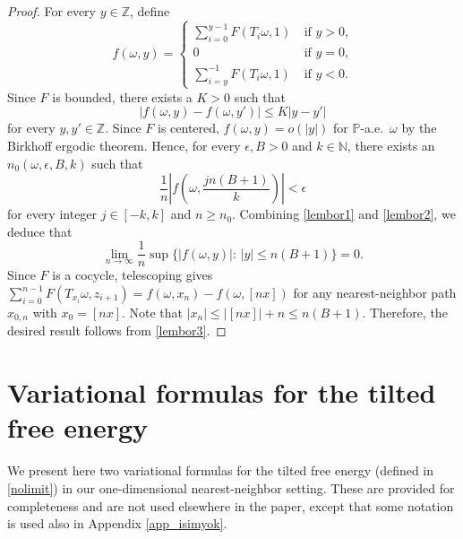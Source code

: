 \documentclass[a4paper]{amsart}
\numberwithin{equation}{section}
\theoremstyle{plain}
\theoremstyle{remark}
\begin{document}
\begin{proof}
For every $y\in\mathbb{Z}$, define
$$f(\omega,y) = \begin{cases}\sum_{i=0}^{y-1}F(T_i\omega,1)&\ \text{if $y>0$,}\\0&\ \text{if $y=0$,}\\\sum_{i=y}^{-1}F(T_i\omega,1)&\ \text{if $y<0$.}\end{cases}$$
Since $F$ is bounded, there exists a $K>0$ such that
\begin{equation}\label{lembor1}
|f(\omega,y) - f(\omega,y')| \le K|y-y'|
\end{equation}
for every $y,y'\in\mathbb{Z}$. Since $F$ is centered, $f(\omega,y) = o(|y|)$ for $\mathbb{P}$-a.e.\ $\omega$ by the Birkhoff ergodic theorem. Hence, for every ${\epsilon},B>0$ and $k\in\mathbb{N}$, there exists an $n_0(\omega,{\epsilon},B,k)$ such that
\begin{equation}\label{lembor2}
\frac1{n}\left|f\left(\omega,\frac{jn(B+1)}{k}\right)\right| < {\epsilon}
\end{equation}
for every integer $j\in[-k,k]$ and $n\ge n_0$. Combining \eqref{lembor1} and \eqref{lembor2}, we deduce that
\begin{equation}\label{lembor3}
\lim_{n\to\infty}\frac1{n}\sup\{|f(\omega,y)|:\,|y|\le n(B+1)\} = 0.
\end{equation}
Since $F$ is a cocycle, telescoping gives $\sum_{i=0}^{n-1}F(T_{x_i}\omega,z_{i+1}) = f(\omega,x_n) - f(\omega,[nx])$ for any nearest-neighbor path $x_{0,n}$ with $x_0 = [nx]$. Note that $|x_n| \le |[nx]| + n \le n(B+1)$. Therefore, the desired result follows from \eqref{lembor3}. 
\end{proof}

\section{Variational formulas for the tilted free energy}\label{app_varfor}
{}{We present here two variational formulas for the tilted free energy 
(defined in \eqref{nolimit}) in our one-dimensional nearest-neighbor setting.
These are provided for completeness and are not used elsewhere in the paper,
except that some notation is used also in Appendix \ref{app_isimyok}.}
\end{document}
